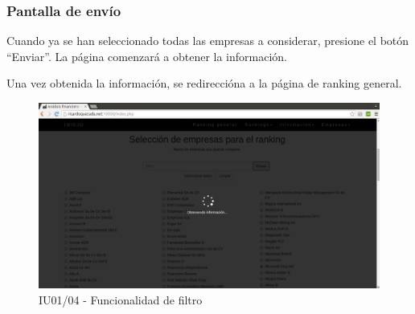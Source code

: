     \subsubsection{Pantalla de envío}

    Cuando ya se han seleccionado todas las empresas a considerar,
    presione el botón ``Enviar''.
    La página comenzará a obtener la información.

    Una vez obtenida la información, se redireccióna a la página
    de ranking general.

    \begin{figure}[H]
		\begin{center}
			\includegraphics[scale=0.3]{pantallas/Index4}
			\caption{IU01/04 - Funcionalidad de filtro}
		\end{center}
	\end{figure}
